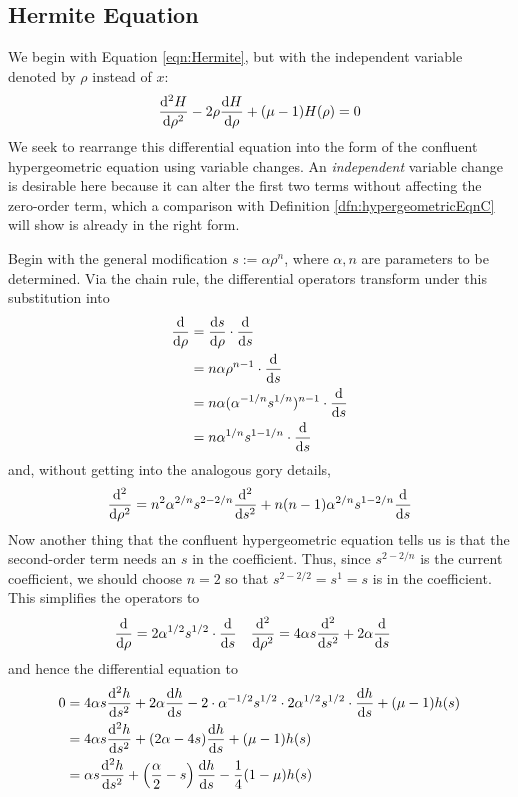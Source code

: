 \documentclass[titlepage]{article}
\numberwithin{equation}{section}
\begin{document}
\subsection{Hermite Equation}
We begin with Equation \ref{eqn:Hermite}, but with the independent variable denoted by $\rho$ instead of $x$:
\begin{equation*}
    \dv[2]{H}{\rho}-2\rho\dv{H}{\rho}+(\mu-1)H(\rho) = 0
\end{equation*}
We seek to rearrange this differential equation into the form of the confluent hypergeometric equation using variable changes. An \emph{independent} variable change is desirable here because it can alter the first two terms without affecting the zero-order term, which a comparison with Definition \ref{dfn:hypergeometricEqnC} will show is already in the right form.\par
Begin with the general modification $s:=\alpha\rho^n$, where $\alpha,n$ are parameters to be determined. Via the chain rule, the differential operators transform under this substitution into
\begin{align*}
    \dv{\rho} &= \dv{s}{\rho}\cdot\dv{s}\\
    &= n\alpha\rho^{n-1}\cdot\dv{s}\\
    &= n\alpha(\alpha^{-1/n}s^{1/n})^{n-1}\cdot\dv{s}\\
    &= n\alpha^{1/n}s^{1-1/n}\cdot\dv{s}
\end{align*}
and, without getting into the analogous gory details,
\begin{equation*}
    \dv[2]{\rho} = n^2\alpha^{2/n}s^{2-2/n}\dv[2]{s}+n(n-1)\alpha^{2/n}s^{1-2/n}\dv{s}
\end{equation*}
Now another thing that the confluent hypergeometric equation tells us is that the second-order term needs an $s$ in the coefficient. Thus, since $s^{2-2/n}$ is the current coefficient, we should choose $n=2$ so that $s^{2-2/2}=s^1=s$ is in the coefficient. This simplifies the operators to
\begin{align*}
    \dv{\rho} &= 2\alpha^{1/2}s^{1/2}\cdot\dv{s}&
    \dv[2]{\rho} &= 4\alpha s\dv[2]{s}+2\alpha\dv{s}
\end{align*}
and hence the differential equation to
\begin{align*}
    0 &= 4\alpha s\dv[2]{h}{s}+2\alpha\dv{h}{s}-2\cdot\alpha^{-1/2}s^{1/2}\cdot 2\alpha^{1/2}s^{1/2}\cdot\dv{h}{s}+(\mu-1)h(s)\\
    &= 4\alpha s\dv[2]{h}{s}+(2\alpha-4s)\dv{h}{s}+(\mu-1)h(s)\\
    &= \alpha s\dv[2]{h}{s}+\left( \frac{\alpha}{2}-s \right)\dv{h}{s}-\frac{1}{4}(1-\mu)h(s)
\end{align*}
\end{document}
